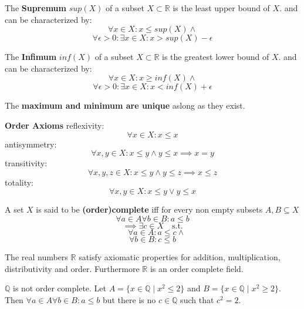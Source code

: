 \begin{definition}
    The \textbf{Supremum} $sup(X)$ of a subset $X \subset \mathbb{R}$ is the least upper bound of $X$. and can be characterized by:
    $$\forall x \in X: x \leq sup(X) \land$$
    $$\forall \epsilon \gt 0: \exists x \in X: x \gt sup(X) - \epsilon$$    
\end{definition}

\begin{definition}
    The \textbf{Infimum} $inf(X)$ of a subset $X \subset \mathbb{R}$ is the greatest lower bound of $X$. and can be characterized by:
    $$\forall x \in X: x \geq inf(X) \land$$
    $$\forall \epsilon \gt 0: \exists x \in X: x \lt inf(X) + \epsilon$$
\end{definition}

\begin{theorem}
    The \textbf{maximum and minimum are unique} aslong as they exist.
\end{theorem}

\begin{definition}
    \textbf{Order Axioms}
    reflexivity: 
    $$\forall x \in X: x \leq x$$
    antisymmetry: 
    $$\forall x, y \in X: x \leq y \land y \leq x \implies x = y$$
    transitivity: 
    $$\forall x, y, z \in X: x \leq y \land y \leq z \implies x \leq z$$
    totality: 
    $$\forall x, y \in X: x \leq y \lor y \leq x$$
\end{definition}

\begin{definition}
    A set $X$ is said to be \textbf{(order)complete} iff for every non empty subsets $A, B \subseteq X$
    $$\forall a \in A \forall b \in B: a \leq b$$
    $$\implies \exists c \in X \quad \text{s.t.}$$
    $$\quad \forall a \in A: a \leq c \land$$
    $$\forall b \in B: c \leq b$$
\end{definition}

\begin{example}
    The real numbers $\mathbb{R}$ satisfy axiomatic properties for addition, multiplication, distributivity and order. Furthermore $\mathbb{R}$ is an order complete field.
\end{example}

\begin{example}
    $\mathbb{Q}$ is not order complete. Let $A = \{x \in \mathbb{Q} \mid x^2 \leq 2\}$ and $B = \{x \in \mathbb{Q} \mid x^2 \geq 2\}$. Then $\forall a \in A \forall b \in B: a \leq b$ but there is no $c \in \mathbb{Q}$ such that $c^2 = 2$.
\end{example}

